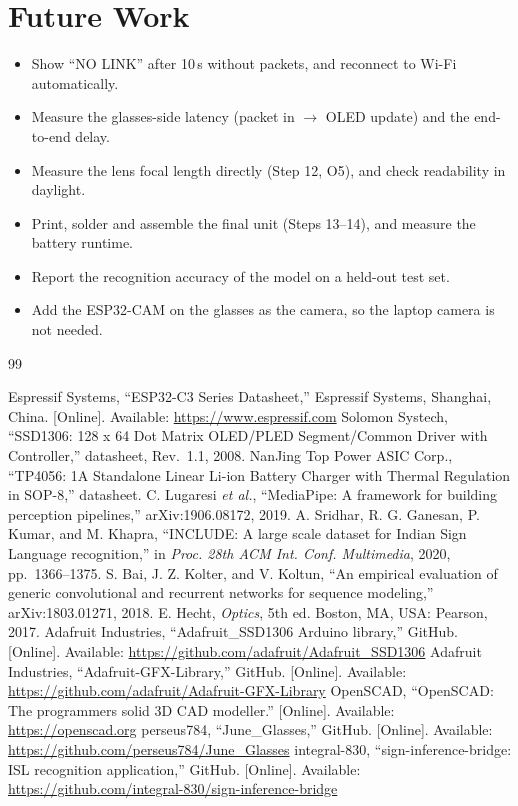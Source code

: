 \documentclass[12pt,a4paper]{report}
\begin{document}
\section{Future Work}
\begin{itemize}
  \item Show ``NO LINK'' after 10\,s without packets, and reconnect to Wi-Fi automatically.
  \item Measure the glasses-side latency (packet in $\rightarrow$ OLED update) and the end-to-end delay.
  \item Measure the lens focal length directly (Step 12, O5), and check readability in daylight.
  \item Print, solder and assemble the final unit (Steps 13--14), and measure the battery runtime.
  \item Report the recognition accuracy of the model on a held-out test set.
  \item Add the ESP32-CAM on the glasses as the camera, so the laptop camera is not needed.
\end{itemize}

\clearpage
{}
{}
\begin{thebibliography}{99}
\raggedright
{} Espressif Systems, ``ESP32-C3 Series Datasheet,'' Espressif Systems, Shanghai, China. [Online]. Available: \url{https://www.espressif.com}
 Solomon Systech, ``SSD1306: 128 x 64 Dot Matrix OLED/PLED Segment/Common Driver with Controller,'' datasheet, Rev.~1.1, 2008.
 NanJing Top Power ASIC Corp., ``TP4056: 1A Standalone Linear Li-ion Battery Charger with Thermal Regulation in SOP-8,'' datasheet.
 C. Lugaresi \emph{et al.}, ``MediaPipe: A framework for building perception pipelines,'' arXiv:1906.08172, 2019.
 A. Sridhar, R. G. Ganesan, P. Kumar, and M. Khapra, ``INCLUDE: A large scale dataset for Indian Sign Language recognition,'' in \emph{Proc. 28th ACM Int. Conf. Multimedia}, 2020, pp.~1366--1375.
 S. Bai, J. Z. Kolter, and V. Koltun, ``An empirical evaluation of generic convolutional and recurrent networks for sequence modeling,'' arXiv:1803.01271, 2018.
 E. Hecht, \emph{Optics}, 5th ed. Boston, MA, USA: Pearson, 2017.
 Adafruit Industries, ``Adafruit\_SSD1306 Arduino library,'' GitHub. [Online]. Available: \url{https://github.com/adafruit/Adafruit_SSD1306}
 Adafruit Industries, ``Adafruit-GFX-Library,'' GitHub. [Online]. Available: \url{https://github.com/adafruit/Adafruit-GFX-Library}
 OpenSCAD, ``OpenSCAD: The programmers solid 3D CAD modeller.'' [Online]. Available: \url{https://openscad.org}
 perseus784, ``June\_Glasses,'' GitHub. [Online]. Available: \url{https://github.com/perseus784/June_Glasses}
 integral-830, ``sign-inference-bridge: ISL recognition application,'' GitHub. [Online]. Available: \url{https://github.com/integral-830/sign-inference-bridge}
\end{thebibliography}
\end{document}
